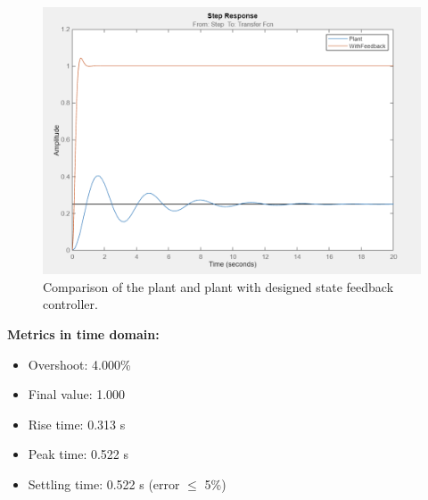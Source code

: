 \documentclass[12pt, oneside]{article}
\begin{document}
\begin{figure}[htbp]
    \centering
    \includegraphics[width=\linewidth]{Report/pics/Compare.png}
    \caption{Comparison of the plant and plant with designed state feedback controller.}
    \label{fig:my_label}
\end{figure}


\FloatBarrier

\textbf{Metrics in time domain:}
\begin{itemize}
            \item Overshoot: 4.000\%
            \item Final value: 1.000
            \item Rise time: 0.313 s
            \item Peak time: 0.522 s
            \item Settling time: 0.522 s (error $\leq$ 5\%)
        \end{itemize}
\end{document}
